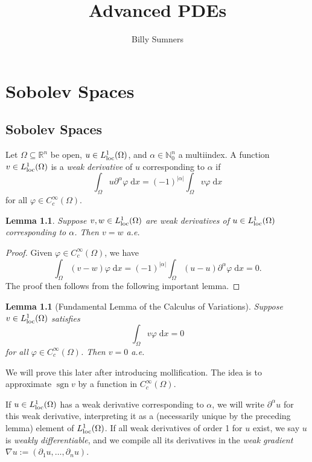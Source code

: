 \documentclass{book}
\title{Advanced PDEs}
\author{Billy Sumners}
\newcommand{\bbN}{\mathbb{N}}
\newcommand{\bbR}{\mathbb{R}}
\renewcommand{\d}{\mathrm{d}}
\renewcommand{\phi}{\varphi}
\newcommand{\abs}[1]{\left\lvert {#1} \right\rvert}
\DeclareMathOperator{\sgn}{sgn}
\newtheorem{lemma}[theorem]{Lemma}
\theoremstyle{definition}
\numberwithin{equation}{chapter}
\begin{document}
\maketitle 

\tableofcontents

\chapter{Sobolev Spaces}
\section{Sobolev Spaces}

Let $\Omega \subseteq \bbR^n$ be open, $u \in L^1_{\rm loc}(\Omega)$, and $\alpha \in \bbN_0^n$ a multiindex. A function $v \in L^1_{\rm loc}(\Omega)$ is a \textit{weak derivative} of $u$ corresponding to $\alpha$ if 
\begin{equation}
    \int_\Omega u \partial^\alpha \phi \; \d{x} = (-1)^{\abs{\alpha}} \int_\Omega v \phi \; \d{x}
\end{equation}
for all $\phi \in C_c^\infty(\Omega)$.
\begin{lemma}
    Suppose $v,w \in L^1_{\rm loc}(\Omega)$ are weak derivatives of $u \in L^1_{\rm loc}(\Omega)$ corresponding to $\alpha$. Then $v = w$ a.e.
\end{lemma}
\begin{proof}
    Given $\phi \in C_c^\infty(\Omega)$, we have 
    \begin{equation}
        \int_\Omega (v-w)\phi \; \d{x} = (-1)^{\abs{\alpha}} \int_\Omega (u - u) \partial^\alpha \phi \; \d{x} = 0.
    \end{equation}
    The proof then follows from the following important lemma.
\end{proof}

\begin{lemma}[Fundamental Lemma of the Calculus of Variations]
    Suppose $v \in L^1_{\rm loc}(\Omega)$ satisfies 
    \begin{equation}
        \int_\Omega v\phi \; \d{x} = 0
    \end{equation}
    for all $\phi \in C_c^\infty(\Omega)$. Then $v = 0$ a.e.
\end{lemma}
We will prove this later after introducing mollification. The idea is to approximate $\sgn{v}$ by a function in $C_c^\infty(\Omega)$.

If $u \in L^1_{\rm loc}(\Omega)$ has a weak derivative corresponding to $\alpha$, we will write $\partial^\alpha u$ for this weak derivative, interpreting it as a (necessarily unique by the preceding lemma) element of $L^1_{\rm loc}(\Omega)$. If all weak derivatives of order 1 for $u$ exist, we say $u$ is \textit{weakly differentiable}, and we compile all its derivatives in the \textit{weak gradient} $\nabla u := (\partial_1 u,\dots,\partial_n u)$.
\end{document}
